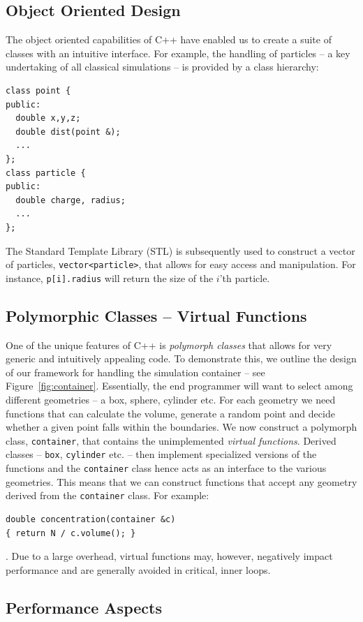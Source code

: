 \documentclass[10pt]{bmc_article}
\newenvironment{bmcformat}{\fussy\setboolean{publ}{true}}{\fussy}
\begin{document}
\begin{bmcformat}
\subsection*{Object Oriented Design}
The object oriented capabilities of C++ have enabled us to create a suite of classes with an intuitive interface.
For example, the handling of particles -- a key undertaking of all classical simulations -- is provided by a class hierarchy:
\begin{verbatim}
class point {
public:
  double x,y,z;
  double dist(point &);
  ...
};
class particle {
public:
  double charge, radius;
  ...
};
\end{verbatim}
The Standard Template Library (STL) is subsequently used to construct a vector of particles, \verb"vector<particle>", that allows for easy access and manipulation.
For instance, \verb"p[i].radius" will return the size of the $i$'th particle.

\subsection*{Polymorphic Classes -- Virtual Functions}
One of the unique features of C++ is \emph{polymorph classes} that allows for very generic and intuitively appealing code.
To demonstrate this, we outline the design of our framework for handling the simulation container -- see Figure~\ref{fig:container}.
Essentially, the end programmer will want to select among different geometries -- a box, sphere, cylinder etc.
For each geometry we need functions that can calculate the volume, generate a random point and decide whether a given point falls within the boundaries.
We now construct a polymorph class, \verb"container", that contains the unimplemented \emph{virtual functions}.
Derived classes -- \verb"box", \verb"cylinder" etc. -- then implement specialized versions of the functions and the \verb"container" class hence acts as an interface to the various geometries.
This means that we can construct functions that accept any geometry derived from the \verb"container" class.
For example:
\begin{verbatim}
double concentration(container &c)
{ return N / c.volume(); }
\end{verbatim}.
Due to a large overhead, virtual functions may, however, negatively impact performance and are generally avoided in critical, inner loops.

\subsection*{Performance Aspects}

\end{bmcformat}
\end{document}
